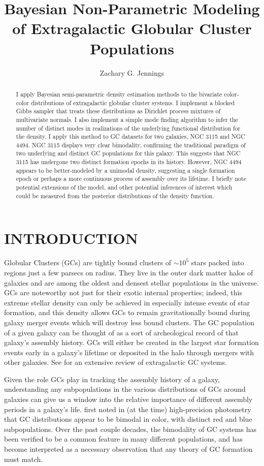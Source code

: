 \documentclass{article}
\title{Bayesian Non-Parametric Modeling of Extragalactic Globular Cluster Populations}
\author{Zachary G. Jennings}
\begin{document}
\maketitle

\begin{abstract}
I apply Bayesian semi-parametric density estimation methods to the bivariate color-color distributions of
extragalactic globular cluster systems. I implement a blocked Gibbs sampler that treats these distributions
as Dirichlet process mixtures of multivariate normals. I also implement a simple mode finding algorithm to
infer the number of distinct modes in realizations of the underlying functional distribution for the density.
I apply this method to GC datasets for two galaxies, NGC 3115 and NGC 4494. NGC 3115 displays very clear bimodality,
confirming the traditional paradigm of two underlying and distinct GC populations for this galaxy. This suggests that
NGC 3115 has undergone two distinct formation epochs in its history. However, NGC 4494 appears to be better-modeled
by a unimodal density, suggesting a single formation epoch or perhaps a more continuous process of assembly over
its lifetime. I briefly note potential extensions of the model, and other potential inferences of interest which could
be measured from the posterior distributions of the density function.
\end{abstract}

\section{INTRODUCTION}
Globular Clusters (GCs) are tightly bound clusters of $\sim10^5$ stars packed into regions just a few
parsecs on radius. They live in the outer dark matter halos of galaxies and are among the oldest and densest
stellar populations in the universe. GCs are noteworthy not just for their exotic internal properties; indeed, this extreme
stellar density can only be achieved in especially intense events of star formation, and this density allows GCs to remain
gravitationally bound during galaxy merger events which will destroy less bound clusters. The GC population
of a given galaxy can be thought of as a sort of archeological record of that galaxy's assembly history. GCs will
either be created in the largest star formation events early in a galaxy's lifetime or deposited in the halo through mergers
with other galaxies. See \citealt{brodie2006} for an extensive review of extragalactic GC systems.

Given the role GCs play in tracking the assembly history of a galaxy, understanding any subpopulations in the various
distributions of GCs around galaxies can give us a window into the relative importance of different assembly periods
in a galaxy's life. \citealt{zepf1993} first noted in (at the time) high-precision photometry that GC distributions
appear to be bimodal in color, with distinct red and blue subpopulations. Over the past couple decades, the bimodality
of GC systems has been verified to be a common feature in many different populations, and has become interpreted
as a necessary observation that any theory of GC formation must match. 
\end{document}
